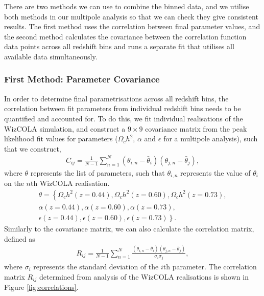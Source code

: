 \documentclass[a4paper,fleqn,usenatbib]{mnras}
\begin{document}
There are two methods we can use to combine the binned data, and we utilise both methods in our multipole analysis so that we can check they give consistent results. The first method uses the correlation between final parameter values, and the second method calculates the covariance between the correlation function data points across all redshift bins and runs a separate fit that utilises all available data simultaneously.



\subsubsection{First Method: Parameter Covariance} \label{sec:parameterCov}

In order to determine final parametrisations across all redshift bins, the correlation between fit parameters from individual redshift bins needs to be quantified and accounted for. To do this, we fit individual realisations of the WizCOLA simulation, and construct a $9\times 9$ covariance matrix from the peak likelihood fit values for parameters ($\Omega_c h^2$, $\alpha$ and $\epsilon$ for a multipole analysis), such that we construct,
\begin{align}
C_{ij} = \frac{1}{N-1} \sum\limits_{n=1}^{N} (\theta_{i,n} - \bar{\theta}_i)(\theta_{j,n} - \bar{\theta}_j),
\end{align}
where $\theta$ represents the list of parameters, such that $\theta_{i,n}$ represents the value of $\theta_i$ on the $n$th WizCOLA realisation.
\begin{align*}
\theta=\left\lbrace \Omega_c h^2 (z = 0.44), \Omega_c h^2 (z = 0.60),  \Omega_c h^2 (z = 0.73), \right. \\ 
\alpha (z = 0.44), \alpha (z = 0.60),  \alpha (z = 0.73), \\
\epsilon (z = 0.44), \left. \epsilon (z = 0.60),  \epsilon (z = 0.73) \right\rbrace.
\end{align*}
Similarly to the covariance matrix, we can also calculate the correlation matrix, defined as
\begin{align}
R_{ij} = \frac{1}{N-1} \sum\limits_{n=1}^{N} \frac{(\theta_{i,n} - \bar{\theta}_i)(\theta_{j,n} - \bar{\theta}_{j})}{\sigma_i \sigma_j},
\end{align}
where $\sigma_i$ represents the standard deviation of the $i$th parameter. The correlation matrix $R_{ij}$ determined from analysis of the WizCOLA realisations is shown in Figure \ref{fig:correlations}. 
\end{document}
